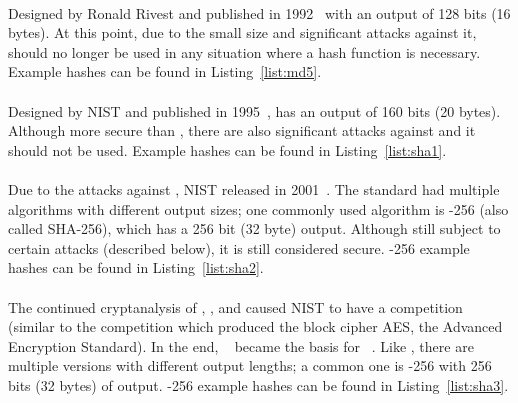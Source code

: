 \paragraph{\MDFive{}} Designed by Ronald Rivest
and published in 1992~\cite{rfc1321} with an output of 128 bits (16 bytes).
At this point, due to the small size and significant attacks against it,
\MDFive{} should no longer be used in any situation
where a \gls{hash function} is necessary.
Example hashes can be found in Listing~\ref{list:md5}.

\paragraph{\ShaOne{}} Designed by NIST and published
in 1995~\cite{FIPS-180-1-1995},
\ShaOne{} has an output of 160 bits (20 bytes).
Although more secure than \MDFive{},
there are also significant attacks against \ShaOne{}
and it should not be used.
Example hashes can be found in Listing~\ref{list:sha1}.

\paragraph{\ShaTwo{}} Due to the attacks against \ShaOne{},
NIST released \ShaTwo{} in 2001~\cite{FIPS-180-4-2015}.
The standard had multiple algorithms with different output sizes;
one commonly used algorithm is \ShaTwo{}-256 (also called SHA-256),
which has a 256 bit (32 byte) output.
Although still subject to certain attacks (described below),
it is still considered secure.
\ShaTwo{}-256 example hashes can be found in Listing~\ref{list:sha2}.

\paragraph{\ShaThree{}}
The continued cryptanalysis of \MDFive{}, \ShaOne{}, and \ShaTwo{}
caused NIST to have a competition (similar to the competition which
produced the block cipher AES, the Advanced Encryption Standard).
In the end, \Keccak{}~\cite{KeccakSponge2011} became the basis
for \ShaThree{}~\cite{FIPS-202}.
Like \ShaTwo{}, there are multiple versions with different output lengths;
a common one is \ShaThree{}-256 with 256 bits (32 bytes) of output.
\ShaThree{}-256 example hashes can be found in Listing~\ref{list:sha3}.








